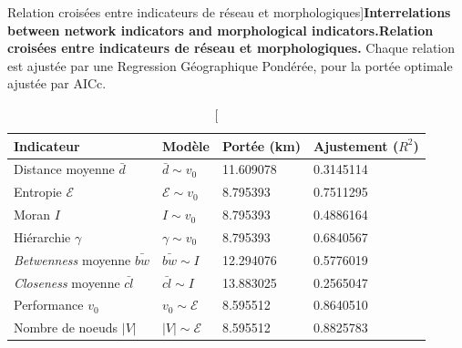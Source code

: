 

\begin{table}
\caption[Interrelations between network indicators and morphological indicators][Relation croisées entre indicateurs de réseau et morphologiques]{\textbf{Interrelations between network indicators and morphological indicators.}\label{tab:staticcorrelations:gwr}}{\textbf{Relation croisées entre indicateurs de réseau et morphologiques.} Chaque relation est ajustée par une Regression Géographique Pondérée, pour la portée optimale ajustée par AICc.\label{tab:staticcorrelations:gwr}}
\begin{tabular}{|l|l|l|l|}
\hline
Indicateur & Modèle & Portée (km) & Ajustement ($R^2$) \\ \hline
Distance moyenne $\bar{d}$ & $\bar{d} \sim v_0$ & 11.609078 & 0.3145114 \\
Entropie $\mathcal{E}$  & $\mathcal{E} \sim v_0$ &  8.795393  &0.7511295 \\
Moran $I$ & $I \sim v_0$ &  8.795393 & 0.4886164 \\
Hiérarchie $\gamma$ & $\gamma \sim v_0$ & 8.795393  & 0.6840567 \\\hline
\emph{Betwenness} moyenne $\bar{bw}$ & $\bar{bw} \sim I$ & 12.294076 & 0.5776019 \\
\emph{Closeness} moyenne $\bar{cl}$ & $\bar{cl}\sim I$ & 13.883025 & 0.2565047 \\
Performance $v_0$ & $v_0 \sim \mathcal{E}$ & 8.595512  & 0.8640510 \\
Nombre de noeuds $\left|V\right|$ & $\left|V\right| \sim \mathcal{E}$ & 8.595512  & 0.8825783 \\\hline
\end{tabular}
\end{table}



